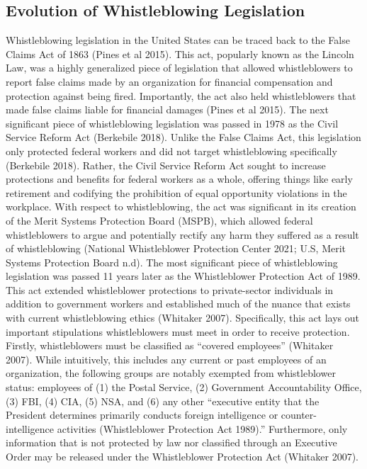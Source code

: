 \documentclass [12 pt] {article}
\begin{document}
\subsection {Evolution of Whistleblowing Legislation}
Whistleblowing legislation in the United States can be traced back to the False Claims Act of 1863 (Pines et al 2015). This act, popularly known as the Lincoln Law, was a highly generalized piece of legislation that allowed whistleblowers to report false claims made by an organization for financial compensation and protection against being fired. Importantly, the act also held whistleblowers that made false claims liable for financial damages (Pines et al 2015).
\bigbreak
The next significant piece of whistleblowing legislation was passed in 1978 as the Civil Service Reform Act (Berkebile 2018). Unlike the False Claims Act, this legislation only protected federal workers and did not target whistleblowing specifically (Berkebile 2018). Rather, the Civil Service Reform Act sought to increase protections and benefits for federal workers as a whole, offering things like early retirement and codifying the prohibition of equal opportunity violations in the workplace. With respect to whistleblowing, the act was significant in its creation of the Merit Systems Protection Board (MSPB), which allowed federal whistleblowers to argue and potentially rectify any harm they suffered as a result of whistleblowing (National Whistleblower Protection Center 2021; U.S, Merit Systems Protection Board n.d).
\bigbreak
The most significant piece of whistleblowing legislation was passed 11 years later as the Whistleblower Protection Act of 1989. This act extended whistleblower protections to private-sector individuals in addition to government workers and established much of the nuance that exists with current whistleblowing ethics (Whitaker 2007). Specifically, this act lays out important stipulations whistleblowers must meet in order to receive protection. Firstly, whistleblowers must be classified as ``covered employees'' (Whitaker 2007). While intuitively, this includes any current or past employees of an organization, the following groups are notably exempted from whistleblower status: employees of (1) the Postal Service, (2) Government Accountability Office, (3) FBI, (4) CIA, (5) NSA, and (6) any other ``executive entity that the President determines primarily conducts foreign intelligence or counter-intelligence activities (Whistleblower Protection Act 1989).'' Furthermore, only information that is not protected by law nor classified through an Executive Order may be released under the Whistleblower Protection Act (Whitaker 2007).
\end{document}
